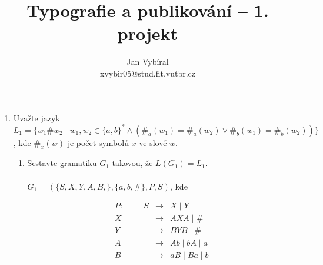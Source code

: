 \documentclass[a4paper,11pt]{article}[24.3.2010]
\author{Jan Vybíral\\xvybir05@stud.fit.vutbr.cz}
\title{Typografie a publikování -- 1. projekt}
\date{}
\begin{document}
\begin{enumerate}
  \item Uvažte jazyk $L_{1}=\{w_{1}\#w_{2} \mid w_{1},w_{2} \in \{a,b\}^* \wedge (\#_{a}(w_{1}) =  \#_{a}(w_{2}) \vee \#_{b}(w_{1}) =  \#_{b}(w_{2}))\}$, kde $\#_{x}(w)$ je počet symbolů $x$ ve slově $w$.
  \renewcommand{\theenumi}{\alph{enumi}}
  \begin{enumerate}
    \item Sestavte gramatiku $G_{1}$ takovou, že $L(G_{1}) = L_{1}$.\\\\
    $G_{1}=(\{S,X,Y,A,B,\},\{a,b,\#\},P,S)$, kde

\begin{eqnarray*}
      P: \:\:\:\:\:\:\:\:\:\:\: S&\rightarrow&X \mid Y\\
      X&\rightarrow&AXA \mid \#\\
      Y&\rightarrow&BYB \mid \#\\
      A&\rightarrow&Ab \mid bA \mid a\\
      B&\rightarrow&aB \mid Ba \mid b
\end{eqnarray*}


\end{enumerate}
\end{enumerate}
\end{document}
